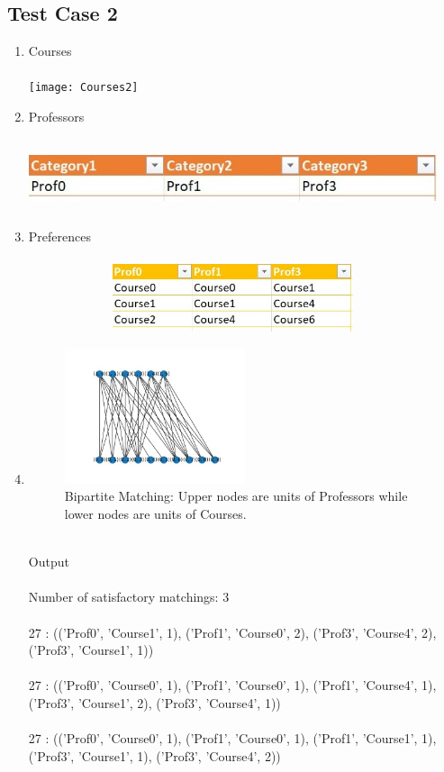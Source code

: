 \subsection{Test Case 2}
\begin{enumerate}
    \item Courses \\ \\ 
    \texttt{[image: Courses2]}
    \item Professors \\ \\ 
    \includegraphics[width=12cm, height=2cm]{images/Professors2.jpeg} \\
    \item Preferences \\ \\
    \includegraphics[width=12cm, height=2cm]{images/Preferences2.jpeg}
    \item
    \begin{figure}[h]
    \centering
    \caption{Bipartite Matching: Upper nodes are units of Professors while lower nodes are units of Courses.}
    \includegraphics[width=0.5\textwidth]{images/Graph2.jpeg}
    \end{figure}\\
    Output \\ \\
    Number of satisfactory matchings: 3 \\ \\
27 : (('Prof0', 'Course1', 1), ('Prof1', 'Course0', 2), ('Prof3', 'Course4', 2), ('Prof3', 'Course1', 1))\\ \\
27 : (('Prof0', 'Course0', 1), ('Prof1', 'Course0', 1), ('Prof1', 'Course4', 1), ('Prof3', 'Course1', 2), ('Prof3', 'Course4', 1))\\ \\
27 : (('Prof0', 'Course0', 1), ('Prof1', 'Course0', 1), ('Prof1', 'Course1', 1), ('Prof3', 'Course1', 1), ('Prof3', 'Course4', 2))
\end{enumerate}

\vspace{2cm}
